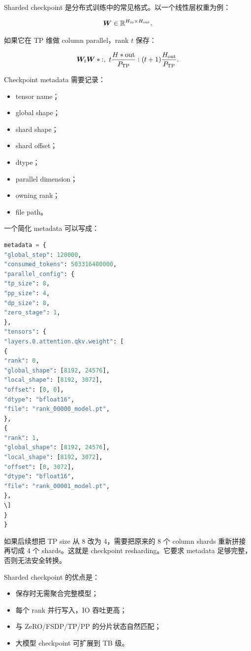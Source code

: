 Sharded checkpoint 是分布式训练中的常见格式。以一个线性层权重为例：

\[
\bm{W}\in\mathbb{R}^{H_{\mathrm{in}}\times H_{\mathrm{out}}}.
\]

如果它在 TP 维做 column parallel，rank $t$ 保存：

\[
\mat{W}_t
\mat{W}*{:,\ t\frac{H*{\mathrm{out}}}{P_{\mathrm{TP}}}:(t+1)\frac{H_{\mathrm{out}}}{P_{\mathrm{TP}}}}.
\]

Checkpoint metadata 需要记录：

\begin{itemize}
\item tensor name；
\item global shape；
\item shard shape；
\item shard offset；
\item dtype；
\item parallel dimension；
\item owning rank；
\item file path。
\end{itemize}

一个简化 metadata 可以写成：

\begin{lstlisting}[language=Python,caption={Sharded checkpoint metadata 的简化示意},label={lst:sharded-checkpoint-metadata}]
metadata = {
"global_step": 120000,
"consumed_tokens": 503316480000,
"parallel_config": {
"tp_size": 8,
"pp_size": 4,
"dp_size": 8,
"zero_stage": 1,
},
"tensors": {
"layers.0.attention.qkv.weight": [
{
"rank": 0,
"global_shape": [8192, 24576],
"local_shape": [8192, 3072],
"offset": [0, 0],
"dtype": "bfloat16",
"file": "rank_00000_model.pt",
},
{
"rank": 1,
"global_shape": [8192, 24576],
"local_shape": [8192, 3072],
"offset": [0, 3072],
"dtype": "bfloat16",
"file": "rank_00001_model.pt",
},
\]
}
}
\end{lstlisting}

如果后续想把 TP size 从 8 改为 4，需要把原来的 8 个 column shards 重新拼接再切成 4 个 shards。这就是 checkpoint resharding。它要求 metadata 足够完整，否则无法安全转换。

Sharded checkpoint 的优点是：

\begin{itemize}
\item 保存时无需聚合完整模型；
\item 每个 rank 并行写入，IO 吞吐更高；
\item 与 ZeRO/FSDP/TP/PP 的分片状态自然匹配；
\item 大模型 checkpoint 可扩展到 TB 级。
\end{itemize}

